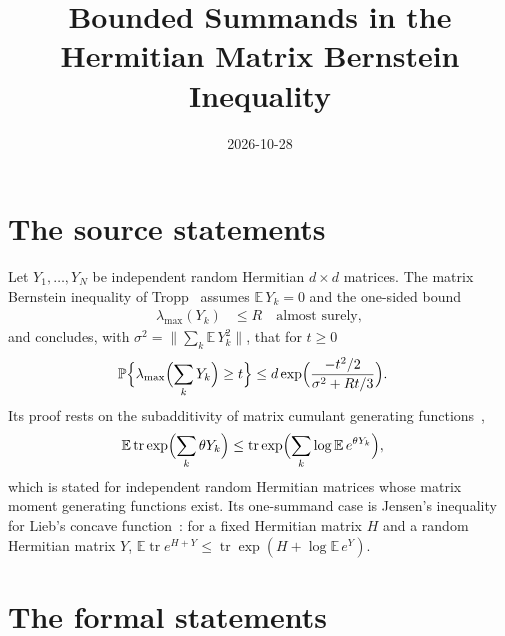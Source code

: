 \documentclass{article}
\title{Bounded Summands in the Hermitian Matrix Bernstein Inequality}
\author{}
\date{2026-10-28}
\begin{document}
\maketitle
{}

\section{The source statements}

Let $Y_1,\dots,Y_N$ be independent random Hermitian $d\times d$ matrices. The
matrix Bernstein inequality of Tropp~\cite[Theorems~1.4 and~6.1]{Tropp2012User}
assumes $\mathbb E\,Y_k=0$ and the one-sided bound
\begin{align}
    \lambda_{\max}(Y_k) & \le R\quad\text{almost surely},
    \label{eq:tropp12_scope_one_sided}
\end{align}
and concludes, with $\sigma^2=\bigl\|\sum_k\mathbb E\,Y_k^2\bigr\|$, that for
$t\ge0$
\begin{align}
    \mathbb P\Bigl\{\lambda_{\max}\Bigl(\sum_kY_k\Bigr)\ge t\Bigr\}
     & \le d\exp\Bigl(\frac{-t^2/2}{\sigma^2+Rt/3}\Bigr).
    \label{eq:tropp12_scope_bernstein}
\end{align}
Its proof rests on the subadditivity of matrix cumulant generating
functions~\cite[Lemma~3.4]{Tropp2012User},
\begin{align}
    \mathbb E\operatorname{tr}\exp\Bigl(\sum_k\theta Y_k\Bigr)
     & \le\operatorname{tr}\exp\Bigl(\sum_k\log\mathbb E\,e^{\theta Y_k}\Bigr),
    \label{eq:tropp12_scope_subadditivity}
\end{align}
which is stated for independent random Hermitian matrices whose matrix moment
generating functions exist. Its one-summand case is Jensen's inequality for
Lieb's concave function~\cite[Corollary~3.3]{Tropp2012User}: for a fixed
Hermitian matrix $H$ and a random Hermitian matrix $Y$,
$\mathbb E\operatorname{tr}e^{H+Y}\le\operatorname{tr}\exp(H+\log\mathbb E\,e^{Y})$.

\section{The formal statements}
\end{document}
